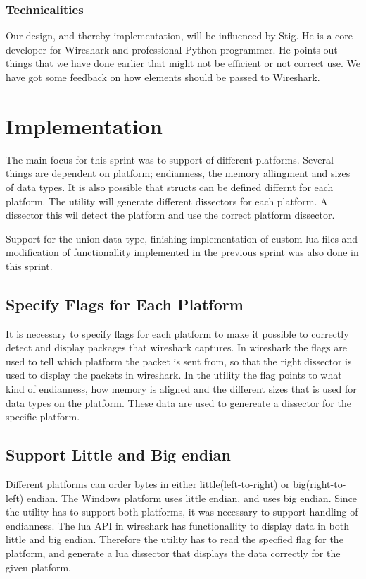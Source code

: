 \subsubsection{Technicalities}
Our design, and thereby implementation, will be influenced by Stig. He is a core developer for Wireshark and professional Python programmer. He points out things that we have done earlier that might not be efficient or not correct use. We have got some feedback on how elements should be passed to Wireshark. 


\section{Implementation}
The main focus for this sprint was to support of different platforms. Several 
things are dependent on platform; \gls{endianness}, the memory allingment and sizes 
of data types. It is also possible that structs can be defined differnt for 
each platform. The \gls{utility} will generate different \glspl{dissector} for each 
platform. A \gls{dissector} this wil detect the platform and use the correct 
platform \gls{dissector}.

Support for the \gls{union} data type, finishing implementation of custom \Gls{lua} files 
and modification of functionallity implemented in the previous sprint was also 
done in this sprint.

\subsection{Specify Flags for Each Platform}
It is necessary to specify flags for each platform to make it possible to 
correctly detect and display packages that wireshark captures. In wireshark 
the flags are used to tell which platform the \gls{packet} is sent from, so that 
the right \gls{dissector} is used to display the packets in \Gls{wireshark}. In the 
\gls{utility} the flag points to what kind of \gls{endianness}, how memory is aligned and 
the different sizes that is used for data types on the platform. These data 
are used to genereate a \gls{dissector} for the specific platform.

\subsection{Support Little and Big \Gls{endian}}
Different platforms can order bytes in either little(left-to-right) or 
big(right-to-left) \gls{endian}. The \Gls{Windows} platform uses little \gls{endian}, and  
uses big \gls{endian}. Since the \gls{utility} has to support both platforms, it was 
necessary to support handling of \gls{endianness}. The \Gls{lua} API in wireshark has 
functionallity to display data in both little and big \gls{endian}. Therefore the 
\gls{utility} has to read the specfied flag for the platform, and generate a \Gls{lua} 
\gls{dissector} that displays the data correctly for the given platform.


